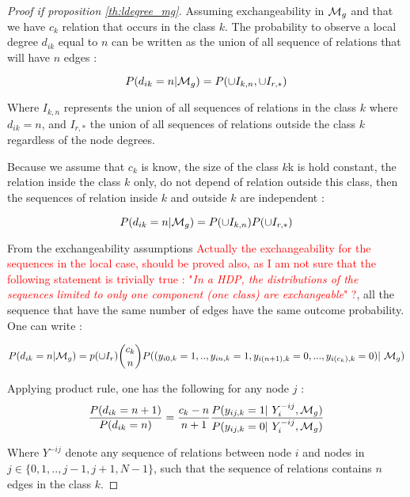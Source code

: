 \begin{proof}[Proof if proposition \ref{th:ldegree_mg}]
    Assuming exchangeability in $\mathcal{M}_g$ and that we have $c_k$ relation that occurs in the
    class $k$. The probability to observe a local degree $d_{ik}$ equal to $n$ can be written as the
    union of all sequence of relations that will have $n$ edges :

\begin{equation}
    P(d_{ik}=n | \mathcal{M}_g) = P( \cup I_{k,n}, \cup I_{r,*})
\end{equation}

Where $I_{k,n}$ represents the union of all sequences of relations in the class $k$ where
    $d_{ik} = n$, and  $I_{r,*}$ the union of all sequences of relations outside the class
    $k$ regardless of the node degrees. 

Because we assume that $c_k$ is know, the size of the class $k$k is hold constant, the
    relation inside the class $k$ only, do not depend of relation outside this class, then
    the sequences of relation inside $k$ and outside $k$ are independent : 

    \begin{equation}
        P(d_{ik}=n | \mathcal{M}_g) = P( \cup I_{k,n}) P( \cup I_{r,*})
    \end{equation}
    
    From the exchangeability assumptions \textcolor{red}{Actually the exchangeability for
    the sequences in the local case, should be proved also, as I am not sure that the
    following statement is trivially true : "\emph{In a HDP, the distributions of the
    sequences limited to only one component (one class) are exchangeable}" ?}, all the
    sequence that have the same number of edges have the same outcome probability. One can
    write : 

\begin{equation}
P(d_{ik}=n | \mg) = p(\cup I_r) \dbinom{c_k}{n} P( (y_{i0, k}=1,..,  y_{in, k}=1,
    y_{i(n+1), k}=0,...,y_{i(c_k), k}=0) | \mg)
\end{equation}

Applying product rule, one has the following for any node $j$ : 
\begin{equation} \label{eq:bb1}
    \frac{P(d_{ik} = n+1)}{P(d_{ik} = n)} = \frac{c_k - n}{n+1} \frac{P(y_{ij,k}=1
    | Y_i^{-ij}, \mg)}{P(y_{ij,k}=0 | Y_i^{-ij}, \mg)}
\end{equation}

Where $Y^{-ij}$ denote any sequence of relations between node $i$ and nodes  in $j \in \{0,1,..,j-1, j+1, N-1\}$,
such that the sequence of relations contains $n$ edges in the class $k$.


\end{proof}
